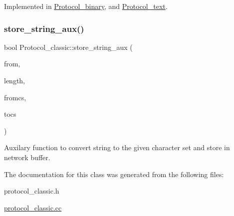 Implemented in \mbox{\hyperlink{classProtocol__binary_ae3111e401880cd6d68b3587e2fbb8091}{Protocol\+\_\+binary}}, and \mbox{\hyperlink{classProtocol__text_a72aad9182cd1313187654ba88712d54a}{Protocol\+\_\+text}}.

\mbox{\label{classProtocol__classic_aa38e38d52e62b7cfb0443ca893a6b4c6}} 
\subsubsection{\texorpdfstring{store\+\_\+string\+\_\+aux()}{store\_string\_aux()}}
{\footnotesize\ttfamily bool Protocol\+\_\+classic\+::store\+\_\+string\+\_\+aux (\begin{DoxyParamCaption}\item[{const char $\ast$}]{from,  }\item[{size\+\_\+t}]{length,  }\item[{const C\+H\+A\+R\+S\+E\+T\+\_\+\+I\+N\+FO $\ast$}]{fromcs,  }\item[{const C\+H\+A\+R\+S\+E\+T\+\_\+\+I\+N\+FO $\ast$}]{tocs }\end{DoxyParamCaption})\hspace{0.3cm}{\ttfamily [protected]}}

Auxilary function to convert string to the given character set and store in network buffer. 

The documentation for this class was generated from the following files\+:\begin{DoxyCompactItemize}
\item 
protocol\+\_\+classic.\+h\item 
\mbox{\hyperlink{protocol__classic_8cc}{protocol\+\_\+classic.\+cc}}\end{DoxyCompactItemize}
